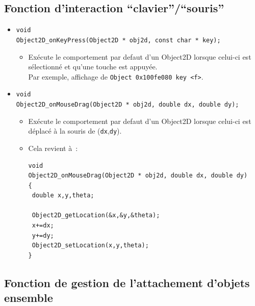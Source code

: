 \documentclass[12pt]{article}
\begin{document}
\subsection{Fonction d'interaction ``clavier''/``souris''}

\begin{itemize}

\item \verb!void! \\
      \verb!Object2D_onKeyPress(Object2D * obj2d, const char * key);!
      \begin{itemize}
      \item Ex\'ecute le comportement par defaut d'un Object2D lorsque
            celui-ci est s\'electionn\'e et qu'une touche est appuy\'ee.\\
            Par exemple, affichage de \verb!Object 0x100fe080 key <f>!.
      \end{itemize}

\vspace{0.2cm}
\item \verb!void! \\
      \verb!Object2D_onMouseDrag(Object2D * obj2d, double dx, double dy);!
      \begin{itemize}
      \item Ex\'ecute le comportement par defaut d'un Object2D lorsque
            celui-ci est d\'eplac\'e \`a la souris de ({\tt dx},{\tt dy}).
\vspace{0.1cm}
      \item Cela revient \`a~:
\begin{small}
\begin{verbatim}
void
Object2D_onMouseDrag(Object2D * obj2d, double dx, double dy)
{
 double x,y,theta;

 Object2D_getLocation(&x,&y,&theta);
 x+=dx;
 y+=dy;
 Object2D_setLocation(x,y,theta);
}
\end{verbatim}
\end{small}
      \end{itemize}

\end{itemize}

\vspace{0.15cm}
\subsection{Fonction de gestion de l'attachement d'objets ensemble}
\end{document}
